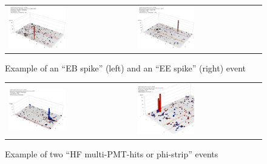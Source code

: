 %
\begin{figure}[h]
 \centering
 \begin{tabular}{ll}
   \includegraphics[width=0.47\textwidth]{fig/EBspike.eps} &
   \includegraphics[width=0.47\textwidth]{fig/EEspike.eps} \\
 \end{tabular}
\caption{Example of an ``EB spike'' (left) and an ``EE spike'' (right) event}
\label{fig:EBEEspike}
\end{figure}


%
\begin{figure}[h]
 \centering
 \begin{tabular}{ll}
   \includegraphics[width=0.47\textwidth]{fig/HFmultiHits.eps} &
   \includegraphics[width=0.47\textwidth]{fig/HFmultiHits_2.eps} \\
 \end{tabular}
\caption{Example of two ``HF multi-PMT-hits or phi-strip'' events}
\label{fig:HFmultiHits}
\end{figure}

